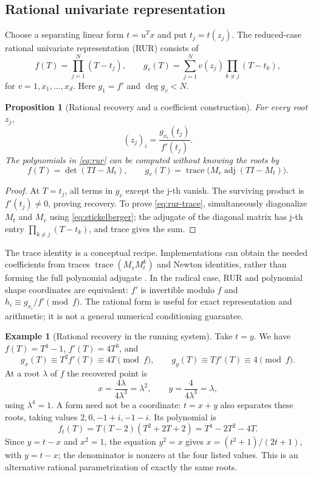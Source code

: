 \documentclass[12pt]{article}
\DeclareMathOperator{\adj}{adj}
\DeclareMathOperator{\tr}{trace}
\newtheorem{proposition}[theorem]{Proposition}
\theoremstyle{definition}
\newtheorem{example}[theorem]{Example}
\theoremstyle{remark}
\begin{document}
\subsection{Rational univariate representation}\label{sec:rur}

Choose a separating linear form $t=u^Tx$ and put $t_j=t(z_j)$. The reduced-case
rational univariate representation (RUR) consists of
\begin{equation}\label{eq:rur}
  f(T)=\prod_{j=1}^N(T-t_j),\qquad
  g_v(T)=\sum_{j=1}^N v(z_j)\prod_{k\ne j}(T-t_k),
\end{equation}
for $v=1,x_1,\ldots,x_d$. Here $g_1=f'$ and $\deg g_v<N$.

\begin{proposition}[Rational recovery and a coefficient construction]\label{prop:rur}
For every root $z_j$,
\[
  (z_j)_i=\frac{g_{x_i}(t_j)}{f'(t_j)}.
\]
The polynomials in \eqref{eq:rur} can be computed without knowing the roots by
\begin{equation}\label{eq:rur-trace}
  f(T)=\det(TI-M_t),\qquad
  g_v(T)=\tr\bigl(M_v\adj(TI-M_t)\bigr).
\end{equation}
\end{proposition}

\begin{proof}
At $T=t_j$, all terms in $g_v$ except the j-th vanish. The surviving product is
$f'(t_j)\ne0$, proving recovery. To prove \eqref{eq:rur-trace}, simultaneously
diagonalize $M_t$ and $M_v$ using \eqref{eq:stickelberger}; the adjugate of the
diagonal matrix has j-th entry $\prod_{k\ne j}(T-t_k)$, and trace gives the sum.
\end{proof}

The trace identity is a conceptual recipe. Implementations can obtain the needed
coefficients from traces $\tr(M_vM_t^k)$ and Newton identities, rather than forming
the full polynomial adjugate \cite{rouillier1999solving,alonso1996zeros}. In the
radical case, RUR and polynomial shape coordinates are equivalent: $f'$ is invertible
modulo $f$ and $h_i\equiv g_{x_i}/f'\pmod f$. The rational form is useful for exact
representation and arithmetic; it is not a general numerical conditioning guarantee.

\begin{example}[Rational recovery in the running system]\label{ex:rur}
Take $t=y$. We have $f(T)=T^4-1$, $f'(T)=4T^3$, and
\[
  g_x(T)\equiv T^2f'(T)\equiv4T\pmod f,\qquad
  g_y(T)\equiv Tf'(T)\equiv4\pmod f.
\]
At a root $\lambda$ of $f$ the recovered point is
\[
  x=\frac{4\lambda}{4\lambda^3}=\lambda^2,\qquad
  y=\frac4{4\lambda^3}=\lambda,
\]
using $\lambda^4=1$. A form need not be a coordinate: $t=x+y$ also separates
these roots, taking values $2,0,-1+i,-1-i$. Its polynomial is
\[
  f_t(T)=T(T-2)(T^2+2T+2)=T^4-2T^2-4T.
\]
Since $y=t-x$ and $x^2=1$, the equation $y^2=x$ gives
$x=(t^2+1)/(2t+1)$, with $y=t-x$; the denominator is nonzero at the four listed
values. This is an alternative rational parametrization of exactly the same roots.
\end{example}
\end{document}

